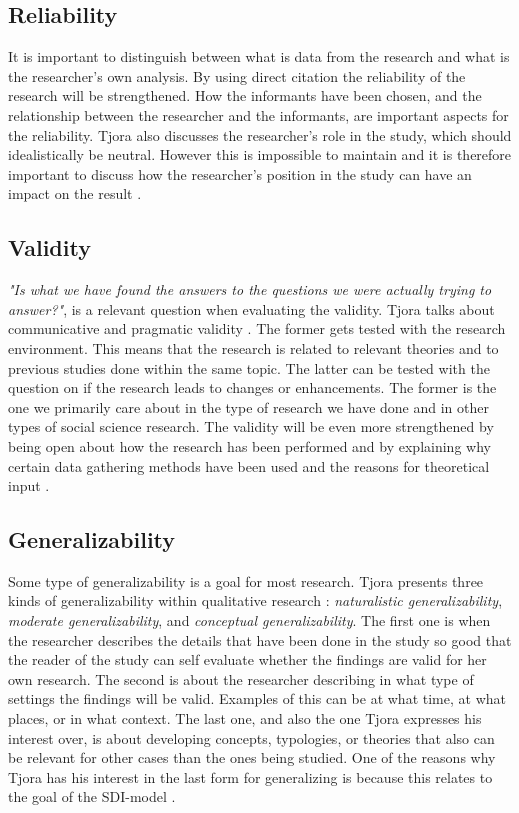 \subsection{Reliability}
It is important to distinguish between what is data from the research and what is the researcher's own analysis. By using direct citation the reliability of the research will be strengthened. How the informants have been chosen, and the relationship between the researcher and the informants, are important aspects for the reliability. Tjora also discusses the researcher's role in the study, which should idealistically be neutral. However this is impossible to maintain and it is therefore important to discuss how the researcher's position in the study can have an impact on the result \cite{tjora}.

\subsection{Validity}
\emph{"Is what we have found the answers to the questions we were actually trying to answer?"}, is a relevant question when evaluating the validity. Tjora talks about communicative and pragmatic validity \cite{tjora}. The former gets tested with the research environment. This means that the research is related to relevant theories and to previous studies done within the same topic. The latter can be tested with the question on if the research leads to changes or enhancements. The former is the one we primarily care about in the type of research we have done and  in other types of social science research. The validity will be even more strengthened by being open about how the research has been performed and by explaining why certain data gathering methods have been used and the reasons for theoretical input \cite{tjora}. 

\subsection{Generalizability}
Some type of generalizability is a goal for most research. Tjora presents three kinds of generalizability within qualitative research \cite{tjora}: \emph{naturalistic generalizability}, \emph{moderate generalizability}, and \emph{conceptual generalizability}. The first one is when the researcher describes the details that have been done in the study so good that the reader of the study can self evaluate whether the findings are valid for her own research. The second is about the researcher describing in what type of settings the findings will be valid. Examples of this can be at what time, at what places, or in what context. The last one, and also the one Tjora expresses his interest over, is about developing concepts, typologies, or theories that also can be relevant for other cases than the ones being studied. One of the reasons why Tjora has his interest in the last form for generalizing is because this relates to the goal of the SDI-model \cite{tjora}.

